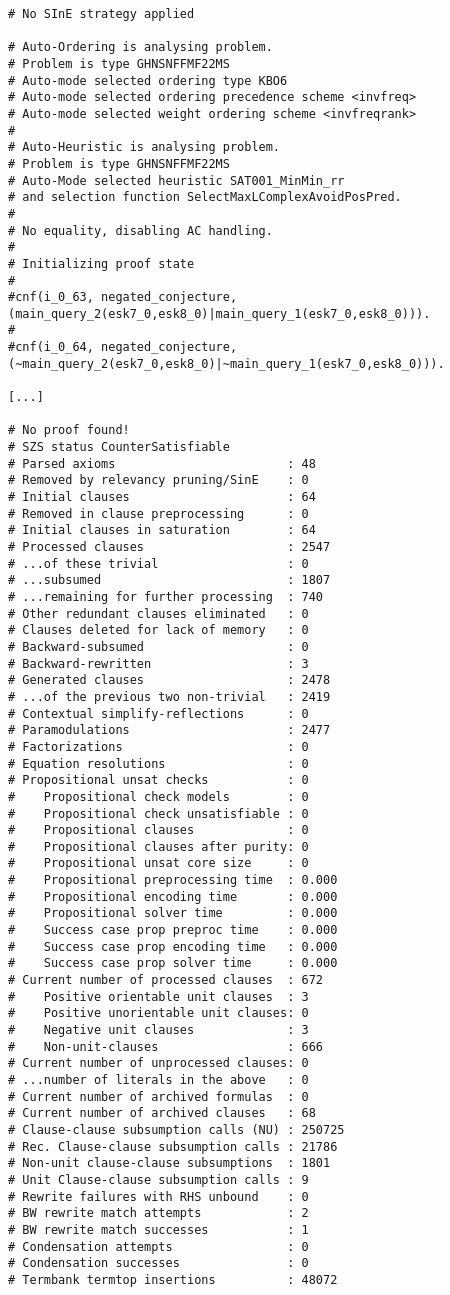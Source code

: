 \documentclass[magisterska,en]{pracamgr}
\begin{document}
\vfill
\pagebreak
\begin{lstlisting}[caption=Example partial output for E for two not equivalent queries (Query 1 and Query 11)]
# No SInE strategy applied

# Auto-Ordering is analysing problem.
# Problem is type GHNSNFFMF22MS
# Auto-mode selected ordering type KBO6
# Auto-mode selected ordering precedence scheme <invfreq>
# Auto-mode selected weight ordering scheme <invfreqrank>
#
# Auto-Heuristic is analysing problem.
# Problem is type GHNSNFFMF22MS
# Auto-Mode selected heuristic SAT001_MinMin_rr
# and selection function SelectMaxLComplexAvoidPosPred.
#
# No equality, disabling AC handling.
#
# Initializing proof state
#
#cnf(i_0_63, negated_conjecture, (main_query_2(esk7_0,esk8_0)|main_query_1(esk7_0,esk8_0))).
#
#cnf(i_0_64, negated_conjecture, (~main_query_2(esk7_0,esk8_0)|~main_query_1(esk7_0,esk8_0))).

[...]

# No proof found!
# SZS status CounterSatisfiable
# Parsed axioms                        : 48
# Removed by relevancy pruning/SinE    : 0
# Initial clauses                      : 64
# Removed in clause preprocessing      : 0
# Initial clauses in saturation        : 64
# Processed clauses                    : 2547
# ...of these trivial                  : 0
# ...subsumed                          : 1807
# ...remaining for further processing  : 740
# Other redundant clauses eliminated   : 0
# Clauses deleted for lack of memory   : 0
# Backward-subsumed                    : 0
# Backward-rewritten                   : 3
# Generated clauses                    : 2478
# ...of the previous two non-trivial   : 2419
# Contextual simplify-reflections      : 0
# Paramodulations                      : 2477
# Factorizations                       : 0
# Equation resolutions                 : 0
# Propositional unsat checks           : 0
#    Propositional check models        : 0
#    Propositional check unsatisfiable : 0
#    Propositional clauses             : 0
#    Propositional clauses after purity: 0
#    Propositional unsat core size     : 0
#    Propositional preprocessing time  : 0.000
#    Propositional encoding time       : 0.000
#    Propositional solver time         : 0.000
#    Success case prop preproc time    : 0.000
#    Success case prop encoding time   : 0.000
#    Success case prop solver time     : 0.000
# Current number of processed clauses  : 672
#    Positive orientable unit clauses  : 3
#    Positive unorientable unit clauses: 0
#    Negative unit clauses             : 3
#    Non-unit-clauses                  : 666
# Current number of unprocessed clauses: 0
# ...number of literals in the above   : 0
# Current number of archived formulas  : 0
# Current number of archived clauses   : 68
# Clause-clause subsumption calls (NU) : 250725
# Rec. Clause-clause subsumption calls : 21786
# Non-unit clause-clause subsumptions  : 1801
# Unit Clause-clause subsumption calls : 9
# Rewrite failures with RHS unbound    : 0
# BW rewrite match attempts            : 2
# BW rewrite match successes           : 1
# Condensation attempts                : 0
# Condensation successes               : 0
# Termbank termtop insertions          : 48072

\end{lstlisting}
\end{document}
